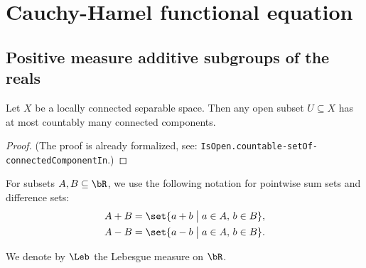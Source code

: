 \chapter{Cauchy-Hamel functional equation}

\section{Positive measure additive subgroups of the reals}

\begin{lemma}
  \label{lem:countably-many-connected-components-of-open}
  \leanok
  Let $X$ be a locally connected separable space. Then any open subset $U \subseteq X$ has at
  most countably many connected components.
\end{lemma}
\begin{proof}
  \leanok
  (The proof is already formalized, see:
  \texttt{IsOpen.countable-setOf-connectedComponentIn}.)
\end{proof}

For subsets $A, B \subseteq \bR$, we use the following notation for pointwise
sum sets and difference sets:
\begin{align*}
  A + B & = \set{ a + b \; \big| \; a \in A, \, b \in B } , \\
  A - B & = \set{ a - b \; \big| \; a \in A, \, b \in B } .
\end{align*}

We denote by $\Leb$ the Lebesgue measure on $\bR$.

